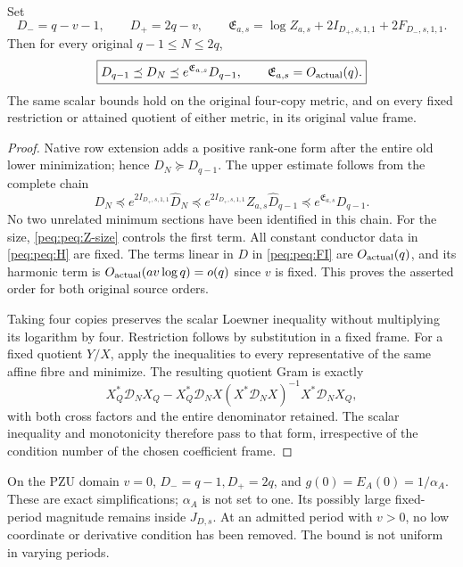 \begin{theorem}
Set
\begin{equation}
 D_-=q-v-1,\qquad D_+=2q-v,\qquad
 \boxed{\mathfrak E_{a,s}
 =\log Z_{a,s}+2I_{D_+,s,1,1}+2F_{D_-,s,1,1}.}
 \label{peq:peq:E}
\end{equation}
Then for every original $q-1\le N\le2q$,
\begin{equation}
 \boxed{D_{q-1}\preceq D_N\preceq
 e^{\mathfrak E_{a,s}}D_{q-1},\qquad
 \mathfrak E_{a,s}=O_{\rm actual}(q).}
 \label{peq:peq:native-bound}
\end{equation}
The same scalar bounds hold on the original four-copy metric, and on every fixed restriction or attained quotient of either metric, in its original value frame.
\end{theorem}
\begin{proof}
Native row extension adds a positive rank-one form after the entire old lower minimization; hence $D_N\succeq D_{q-1}$. The upper estimate follows from the complete chain
\[
 D_N\preceq e^{2I_{D_+,s,1,1}}\widehat D_N
 \preceq e^{2I_{D_+,s,1,1}}Z_{a,s}\widehat D_{q-1}
 \preceq e^{\mathfrak E_{a,s}}D_{q-1}.
\]
No two unrelated minimum sections have been identified in this chain.
For the size, \eqref{peq:peq:Z-size} controls the first term. All constant conductor data in \eqref{peq:peq:H} are fixed. The terms linear in $D$ in \eqref{peq:peq:FI} are $O_{\rm actual}(q)$, and its harmonic term is $O_{\rm actual}(av\log q)=o(q)$ since $v$ is fixed. This proves the asserted order for both original source orders.

Taking four copies preserves the scalar Loewner inequality without multiplying its logarithm by four. Restriction follows by substitution in a fixed frame. For a fixed quotient $Y/X$, apply the inequalities to every representative of the same affine fibre and minimize. The resulting quotient Gram is exactly
\[
 X_Q^*\mathcal D_NX_Q-X_Q^*\mathcal D_NX
            (X^*\mathcal D_NX)^{-1}X^*\mathcal D_NX_Q,
\]
with both cross factors and the entire denominator retained. The scalar inequality and monotonicity therefore pass to that form, irrespective of the condition number of the chosen coefficient frame.
\end{proof}

On the PZU domain $v=0$, $D_-=q-1,D_+=2q$, and $g(0)=E_A(0)=1/\alpha_A$. These are exact simplifications; $\alpha_A$ is not set to one. Its possibly large fixed-period magnitude remains inside $J_{D,s}$. At an admitted period with $v>0$, no low coordinate or derivative condition has been removed. The bound is not uniform in varying periods.

